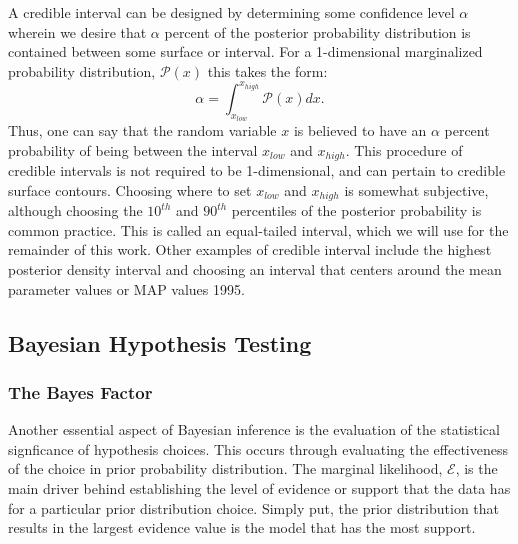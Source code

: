 A credible interval can be designed by determining some confidence level $\alpha$ wherein we desire that $\alpha$ percent of the posterior probability distribution is contained between some surface or interval. For a 1-dimensional marginalized probability distribution, $\mathcal{P}(x)$ this takes the form:
\begin{equation}\label{eqn:credible_interval}
    \alpha = \int^{x_{high}}_{x_{low}} \mathcal{P}(x) dx.
\end{equation}
Thus, one can say that the random variable $x$ is believed to have an $\alpha$ percent probability of being between the interval $x_{low}$ and $x_{high}$. This procedure of credible intervals is not required to be 1-dimensional, and can pertain to credible surface contours. Choosing where to set $x_{low}$ and $x_{high}$ is somewhat subjective, although choosing the $10^{th}$ and $90^{th}$ percentiles of the posterior probability is common practice. This is called an equal-tailed interval, which we will use for the remainder of this work. Other examples of credible interval include the highest posterior density interval and choosing an interval that centers around the mean parameter values or MAP values 1995.

\subsection{Bayesian Hypothesis Testing}
\subsubsection{The Bayes Factor}
Another essential aspect of Bayesian inference is the evaluation of the statistical signficance of hypothesis choices. This occurs through evaluating the effectiveness of the choice in prior probability distribution. The marginal likelihood, $\mathcal{E}$, is the main driver behind establishing the level of evidence or support that the data has for a particular prior distribution choice. Simply put, the prior distribution that results in the largest evidence value is the model that has the most support.

